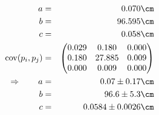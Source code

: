 \begin{eqnarray}
    a &=& 0.070 \cm \nonumber \\
    b &=& 96.595 \cm \nonumber \\
    c &=& 0.058 \cm \nonumber \\
    \mathrm{cov}(p_i, p_j) &=& 
    \begin{pmatrix}
        0.029 &0.180 &0.000 \\
        0.180 &27.885 &0.009 \\
        0.000 &0.009 &0.000 \\
    \end{pmatrix}
\\ \Rightarrow \qquad
    a &=& 0.07 \pm 0.17 \cm\\
    b &=& 96.6 \pm 5.3 \cm\\
    c &=& 0.0584 \pm 0.0026 \cm
\end{eqnarray}

